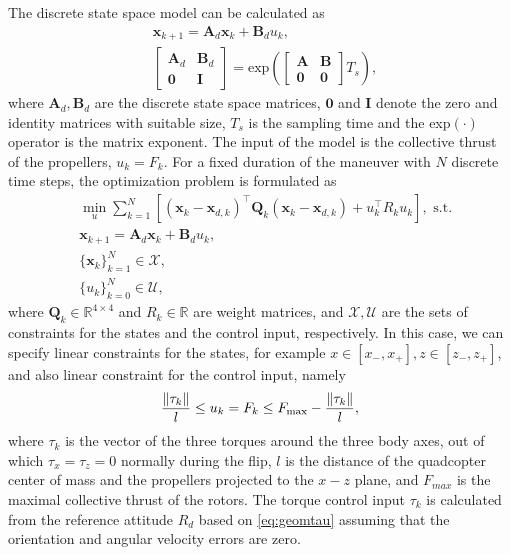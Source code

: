 The discrete state space model can be calculated as \cite{linearsys}
\begin{align}
    & \mathbf x_{k+1} = \mathbf A_d \mathbf x_k + \mathbf B_d u_k,\\
    & \begin{bmatrix} {\mathbf A_{d}} & {\mathbf B_{d}} \\ {\mathbf 0} & {\mathbf I} \end{bmatrix}= \mathrm{exp}\left({{\begin{bmatrix} \mathbf{A} & {\mathbf B} \\ \mathbf{0} & \mathbf{0} \end{bmatrix}}T_s}\right),
\end{align}
where $\mathbf A_d, \mathbf B_d$ are the discrete state space matrices, $\mathbf 0$ and $\mathbf I$ denote the zero and identity matrices with suitable size, $T_s$ is the sampling time and the exp$(\cdot)$ operator is the matrix exponent. The input of the model is the collective thrust of the propellers, $u_k=F_k$. For a fixed duration of the maneuver with $N$ discrete time steps, the optimization problem is formulated as
\begin{subequations}\label{eq:quadprog}
    \begin{align}
        &\min_u \sum_{k=1}^N \left[ \left(\mathbf x_k-\mathbf x_{d,k}\right)^\top \mathbf Q_k  \left(\mathbf x_k-\mathbf x_{d,k}\right) + u_k^\top R_k u_k\right], \text{ s.t.}\\
        &\mathbf x_{k+1} = \mathbf A_d \mathbf x_k +\mathbf B_d u_k,\\
        &\{ \mathbf x_{k}\}_{k=1}^N \in \mathcal{X},\\
        &\{u_{k}\}_{k=0}^N \in \mathcal{U},
    \end{align}
\end{subequations}
where $\mathbf Q_k\in \mathbb{R}^{4\times 4}$ and $R_k \in\mathbb{R}$ are weight matrices, and $\mathcal{X}, \mathcal{U}$ are the sets of constraints for the states and the control input, respectively. In this case, we can specify linear constraints for the states, for example $x\in[x_-,x_+], z\in[z_-, z_+]$, and also linear constraint for the control input, namely
    \begin{align}
        \frac{\norm{\tau_k}}{l} \leq u_k = F_k \leq F_\mathrm{max}-\frac{\norm{\tau_k}}{l},
    \end{align}
where $\tau_k$ is the vector of the three torques around the three body axes, out of which $\tau_x=\tau_z=0$ normally during the flip, $l$ is the distance of the quadcopter center of mass and the propellers projected to the $x-z$ plane, and $F_{max}$ is the maximal collective thrust of the rotors. The torque control input $\tau_k$ is calculated from the reference attitude $R_d$ based on \eqref{eq:geomtau} assuming that the orientation and angular velocity errors are zero.


